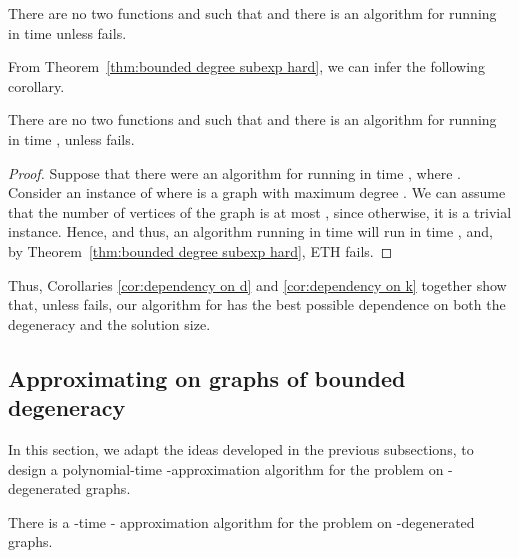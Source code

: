 \begin{corollary}\label{cor:dependency on d}
There are no two functions  and  such that  and there is an algorithm for {\ds} running in time  unless {\ETH} fails.
\end{corollary}




\noindent
From Theorem~\ref{thm:bounded degree subexp hard}, we can infer the following corollary.

\begin{corollary}\label{cor:dependency on k}
 There are no two functions  and  such that  and there is an algorithm for {\ds} running in time , unless {\ETH} fails.
\end{corollary}

\begin{proof}
Suppose that there were an algorithm for {\ds} running in time , where . Consider an instance  of {\ds} where  is a graph with maximum degree . We can assume that the number of vertices of the graph is at most , since otherwise, it is a trivial {\No} instance. Hence,  and thus, an algorithm running in time  will run in time , and, by Theorem~\ref{thm:bounded degree subexp hard}, ETH fails.  
\end{proof}

\noindent
Thus, Corollaries \ref{cor:dependency on d} and \ref{cor:dependency on k} together show that, unless {\ETH} fails, our algorithm for {\ds} has the best possible dependence on both the degeneracy and the solution size.\\



\subsection{Approximating {\ds} on graphs of bounded degeneracy}

In this section, we adapt the ideas developed in the previous subsections, to design a polynomial-time -approximation algorithm for the {\ds} problem on -degenerated graphs.

\begin{theorem}\label{thm:approx_ds}
 There is a -time - approximation algorithm for the {\ds} problem on -degenerated graphs. \end{theorem}

